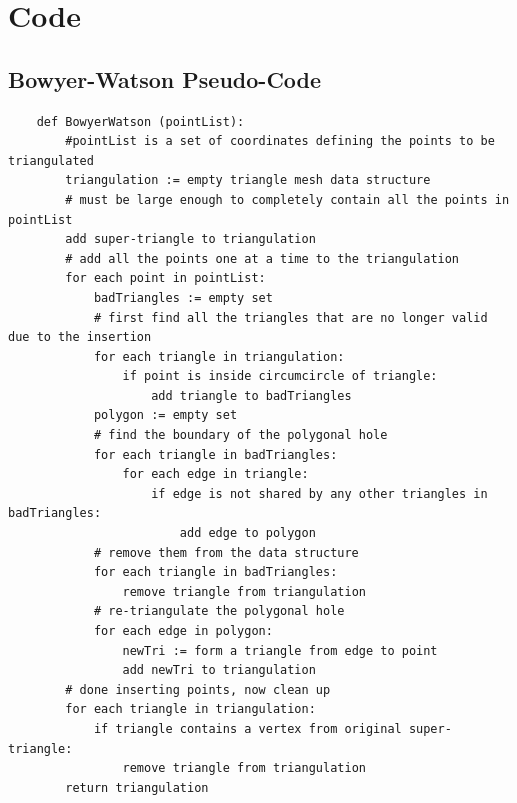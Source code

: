 \documentclass[fyp]{socreport}
\begin{document}



\appendix
\chapter{Code}
\section{Bowyer-Watson Pseudo-Code}
\label{code:a1}
\begin{lstlisting}
	def BowyerWatson (pointList):
		#pointList is a set of coordinates defining the points to be triangulated
		triangulation := empty triangle mesh data structure
		# must be large enough to completely contain all the points in pointList
		add super-triangle to triangulation 
		# add all the points one at a time to the triangulation
		for each point in pointList: 
			badTriangles := empty set
			# first find all the triangles that are no longer valid due to the insertion
			for each triangle in triangulation: 
				if point is inside circumcircle of triangle:
					add triangle to badTriangles
			polygon := empty set
			# find the boundary of the polygonal hole
			for each triangle in badTriangles: 
				for each edge in triangle:
					if edge is not shared by any other triangles in badTriangles:
						add edge to polygon
			# remove them from the data structure
			for each triangle in badTriangles:
				remove triangle from triangulation
			# re-triangulate the polygonal hole
			for each edge in polygon:
				newTri := form a triangle from edge to point
				add newTri to triangulation
		# done inserting points, now clean up
		for each triangle in triangulation:
			if triangle contains a vertex from original super-triangle:
				remove triangle from triangulation
		return triangulation
\end{lstlisting}
\end{document}
